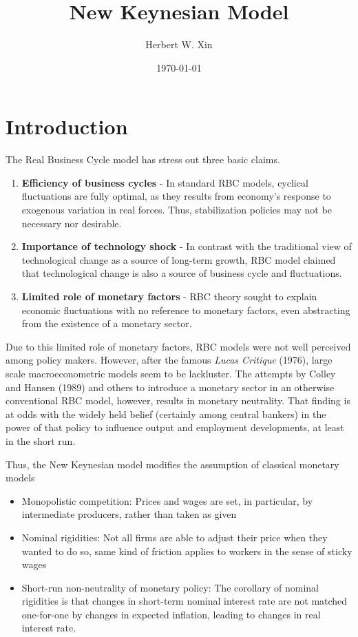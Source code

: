 \documentclass[twocolumn, fleqn]{article}
\begin{document}
	\title{New Keynesian Model}
	\author{Herbert W. Xin}
	\date{\today}
	\maketitle

	\tableofcontents
	\thispagestyle{fancy}
	
	\section{Introduction}
	The Real Business Cycle model has stress out three basic claims. 
	\begin{enumerate}
		\item \textbf{Efficiency of business cycles}  - In standard RBC models, cyclical fluctuations are fully optimal, as they results from economy's response to exogenous variation in real forces. Thus, stabilization policies may not be necessary nor desirable. 
		\item \textbf{Importance of technology shock} - In contrast with the traditional view of technological change as a source of long-term growth, RBC model claimed that technological change is also a source of business cycle and fluctuations. 
		\item \textbf{Limited role of monetary factors} - RBC theory sought to explain economic fluctuations with no reference to monetary factors, even abstracting from the existence of a monetary sector.
	\end{enumerate}
	
	Due to this limited role of monetary factors, RBC models were not well perceived among policy makers. However, after the famous \emph{Lucas Critique} (1976), large scale macroeconometric models seem to be lackluster. The attempts by Colley and Hansen (1989) and others to introduce a monetary sector in an otherwise conventional RBC model, however, results in monetary neutrality. That finding is at odds with the widely held belief (certainly among central bankers) in the power of that policy to influence output and employment developments, at least in the short run.
	
	Thus, the New Keynesian model modifies the assumption of classical monetary models 
	\begin{itemize}
		\item Monopolistic competition: Prices and wages are set, in particular, by intermediate producers, rather than taken as given
		\item Nominal rigidities: Not all firms are able to adjust their price when they wanted to do so, same kind of friction applies to workers in the sense of sticky wages
		\item Short-run non-neutrality of monetary policy: The corollary of nominal rigidities is that changes in short-term nominal interest rate are not matched one-for-one by changes in expected inflation, leading to changes in real interest rate.  
	\end{itemize}
	
\end{document}
